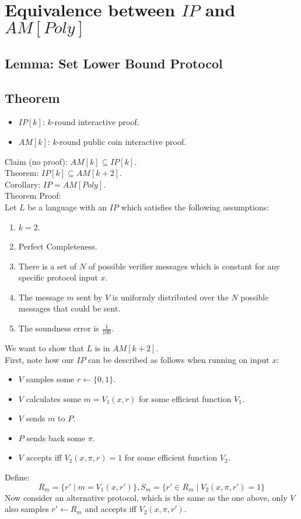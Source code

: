 \section{Equivalence between $IP$ and $AM[Poly]$}
\subsection{Lemma: Set Lower Bound Protocol}%

\subsection{Theorem}
\begin{itemize}
    \item $IP[k]$: $k$-round interactive proof.
    \item $AM[k]$: $k$-round public coin interactive proof.
\end{itemize}
Claim (no proof):
$AM[k]\subseteq IP[k]$.\\
Theorem:
$IP[k]\subseteq AM[k+2]$.\\
Corollary: $IP=AM[Poly]$.\\
Theorem Proof:\\
Let $L$ be a language with an $IP$ which satisfies the following assumptions:
\begin{enumerate}
    \item $k=2$.
    \item Perfect Completeness.
    \item There is a set of $N$ of possible verifier messages which is constant for any specific protocol input $x$.
    \item The message $m$ sent by $V$ is uniformly distributed over the $N$ possible messages that could be sent.
    \item The soundness error is $\frac{1}{100}$.
\end{enumerate}
We want to show that $L$ is in $AM[k+2]$.\\
First, note how our $IP$ can be described as follows when running on input $x$:\\
\begin{itemize}
    \item $V$ samples some $r\leftarrow\{0,1\}$.
    \item $V$ calculates some $m=V_1(x,r)$ for some efficient function $V_1$.
    \item $V$ sends $m$ to $P$.
    \item $P$ sends back some $\pi$.
    \item $V$ accepts iff $V_2(x,\pi,r)=1$ for some efficient function $V_2$.
\end{itemize}
Define:
\[R_m=\{r'\mid m=V_1(x,r')\}, S_m=\{r'\in R_m\mid V_2(x,\pi,r')=1\}\]
Now consider an alternative protocol, which is the same as the one above, only $V$ also samples $r'\leftarrow R_m$ and accepts iff $V_2(x,\pi, r')$.


